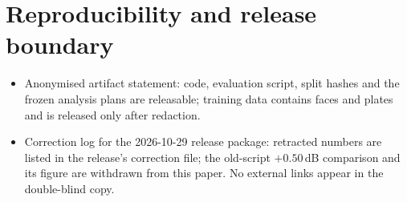 \documentclass[10pt]{article}
\begin{document}
\section{Reproducibility and release boundary}\label{supp:repro}
\begin{itemize}
\item Anonymised artifact statement: code, evaluation script, split hashes and the
  frozen analysis plans are releasable; training data contains faces and plates and
  is released only after redaction.
\item Correction log for the 2026-10-29 release package: retracted numbers are listed
  in the release's correction file; the old-script $+0.50$\,dB comparison and its
  figure are withdrawn from this paper. No external links appear in the
  double-blind copy.
\end{itemize}
\end{document}

